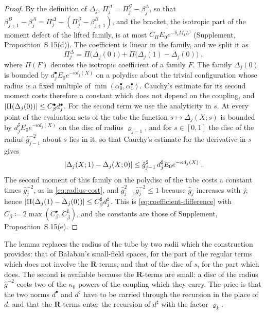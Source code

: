 \documentclass[11pt]{preprint}
\DeclarePairedDelimiter{\abs}{\lvert}{\rvert}
\numberwithin{equation}{section}
\theoremstyle{definition}
\theoremstyle{remark}
\theoremstyle{plain}
\begin{document}
\begin{proof}
By the definition of $\Delta_j$, $\Pi^\Delta_j = \Pi^{\mathcal G}_j - \beta^A_j$, so that $\beta^B_{j+1} - \beta^A_j = \Pi^\Delta_j - (\Pi^{\mathcal G}_j - \beta^B_{j+1})$, and the bracket, the isotropic part of the moment defect of the lifted family, is at most $C_\Pi E_0e^{-\delta_cM_1L^j}$ (Supplement, Proposition~S.15(d)). The coefficient is linear in the family, and we split it as
\begin{equation}\label{eq:coefficient-split}
    \Pi^\Delta_j = \Pi\bigl(\Delta_j(0)\bigr) + \Pi\bigl(\Delta_j(1) - \Delta_j(0)\bigr)\;,
\end{equation}
where $\Pi(F)$ denotes the isotropic coefficient of a family $F$. The family $\Delta_j(0)$ is bounded by $d^\bullet_jE_0e^{-\kappa d_j(X)}$ on a polydisc about the trivial configuration whose radius is a fixed multiple of $\min(\alpha^\bullet_0, \alpha^\bullet_1)$. Cauchy's estimate for its second moment costs therefore a constant which does not depend on the coupling, and $\abs{\Pi(\Delta_j(0))} \leq C^\bullet_\beta d^\bullet_j$. For the second term we use the analyticity in $s$. At every point of the evaluation sets of the tube the function $s \mapsto \Delta_j(X; s)$ is bounded by $d^\sharp_jE_0e^{-\kappa d_j(X)}$ on the disc of radius $\varrho_{j-1}$, and for $s \in [0, 1]$ the disc of the radius $\hat g_{j-1}^{-2}$ about $s$ lies in it, so that Cauchy's estimate for the derivative in $s$ gives
\begin{equation}\label{eq:family-difference}
    \abs{\Delta_j(X; 1) - \Delta_j(X; 0)} \leq \hat g_{j-1}^2\,d^\sharp_jE_0e^{-\kappa d_j(X)}\;.
\end{equation}
The second moment of this family on the polydisc of the tube costs a constant times $\hat g_j^{-2}$, as in \eqref{eq:radius-cost}, and $\hat g_{j-1}^2\hat g_j^{-2} \leq 1$ because $\hat g_j$ increases with $j$; hence $\abs{\Pi(\Delta_j(1) - \Delta_j(0))} \leq C^\sharp_\beta d^\sharp_j$. This is \eqref{eq:coefficient-difference} with $C_\beta \coloneqq 2\max(C^\bullet_\beta, C^\sharp_\beta)$, and the constants are those of Supplement, Proposition~S.15(e).
\end{proof}

The lemma replaces the radius of the tube by two radii which the construction provides: that of Ba{\l}aban's small-field spaces, for the part of the regular terms which does not involve the $\mathbf R$-terms, and that of the disc of $s$, for the part which does. The second is available because the $\mathbf R$-terms are small: a disc of the radius $\hat g^{-2}$ costs two of the $\kappa_0$ powers of the coupling which they carry. The price is that the two norms $d^\bullet$ and $d^\sharp$ have to be carried through the recursion in the place of $d$, and that the $\mathbf R$-terms enter the recursion of $d^\sharp$ with the factor $\varrho_k$.
\end{document}
